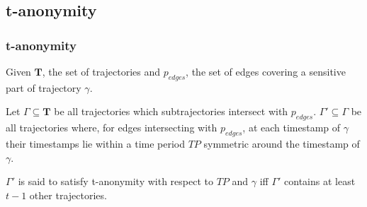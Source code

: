\subsection{t-anonymity} 
\begin{frame}[red] %
\frametitle{t-anonymity}
\begin{definition}[t-anonymity]
Given $\mathbf{T}$, the set of trajectories and $p_{edges}$, the set of edges covering a sensitive part of trajectory $\gamma$. 

Let $\Gamma \subseteq \mathbf{T}$ be all trajectories which subtrajectories intersect with $p_{edges}$. $\Gamma' \subseteq \Gamma$ be all trajectories where, for edges intersecting with $p_{edges}$, at each timestamp of $\gamma$ their timestamps lie within a time period $TP$ symmetric around the timestamp of $\gamma$.

$\Gamma'$ is said to satisfy t-anonymity with respect to $TP$ and $\gamma$ iff $\Gamma'$ contains at least $t-1$ other trajectories.
\end{definition}
\end{frame}